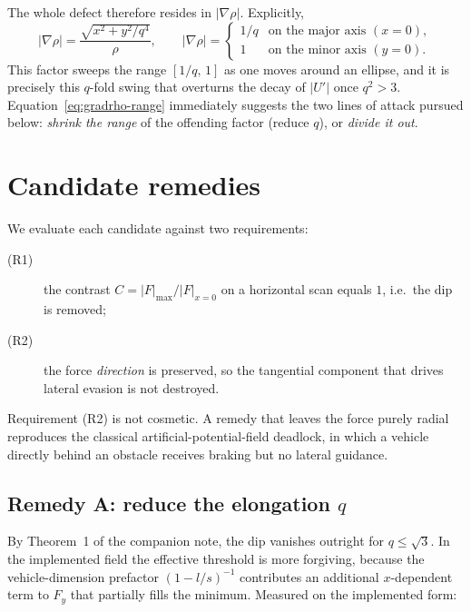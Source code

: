 \documentclass[11pt]{article}
\begin{document}
The whole defect therefore resides in $|\nabla\rho|$. Explicitly,
\begin{equation}
  \bigl|\nabla\rho\bigr|=\frac{\sqrt{x^{2}+y^{2}/q^{4}}}{\rho},
  \qquad
  \bigl|\nabla\rho\bigr|
  =\begin{cases}
     1/q & \text{on the major axis } (x=0),\\[2pt]
     1   & \text{on the minor axis } (y=0).
   \end{cases}
  \label{eq:gradrho-range}
\end{equation}
This factor sweeps the range $[1/q,\,1]$ as one moves around an ellipse, and
it is precisely this $q$-fold swing that overturns the decay of $|U'|$ once
$q^{2}>3$. Equation~\eqref{eq:gradrho-range} immediately suggests the two
lines of attack pursued below: \emph{shrink the range} of the offending
factor (reduce $q$), or \emph{divide it out}.

\section{Candidate remedies}

We evaluate each candidate against two requirements:

\begin{description}
  \item[(R1)] the contrast $C=|F|_{\max}/|F|_{x=0}$ on a horizontal scan
        equals $1$, i.e.\ the dip is removed;
  \item[(R2)] the force \emph{direction} is preserved, so the tangential
        component that drives lateral evasion is not destroyed.
\end{description}

Requirement (R2) is not cosmetic. A remedy that leaves the force purely
radial reproduces the classical artificial-potential-field deadlock, in which
a vehicle directly behind an obstacle receives braking but no lateral
guidance.

\subsection{Remedy A: reduce the elongation \texorpdfstring{$q$}{q}}

By Theorem~1 of the companion note, the dip vanishes outright for
$q\le\sqrt3$. In the implemented field the effective threshold is more
forgiving, because the vehicle-dimension prefactor $(1-l/s)^{-1}$ contributes
an additional $x$-dependent term to $F_{y}$ that partially fills the minimum.
Measured on the implemented form:
\end{document}
